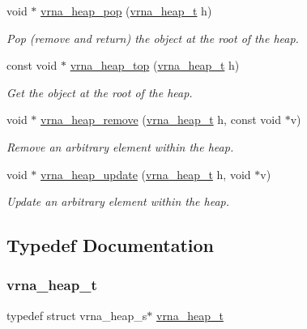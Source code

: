 \begin{DoxyCompactItemize}
void $\ast$ \mbox{\hyperlink{group__heap__utils_ga3b6242f3a1194eb1df2d1fb40d630610}{vrna\+\_\+heap\+\_\+pop}} (\mbox{\hyperlink{group__heap__utils_ga341ea87a651145b986792f6eb3e679c3}{vrna\+\_\+heap\+\_\+t}} h)
\begin{DoxyCompactList}\small\item\em Pop (remove and return) the object at the root of the heap. \end{DoxyCompactList}\item 
const void $\ast$ \mbox{\hyperlink{group__heap__utils_ga534a8483824371019241e340c026111b}{vrna\+\_\+heap\+\_\+top}} (\mbox{\hyperlink{group__heap__utils_ga341ea87a651145b986792f6eb3e679c3}{vrna\+\_\+heap\+\_\+t}} h)
\begin{DoxyCompactList}\small\item\em Get the object at the root of the heap. \end{DoxyCompactList}\item 
void $\ast$ \mbox{\hyperlink{group__heap__utils_ga5e181d5ef8557d502943b938620c7174}{vrna\+\_\+heap\+\_\+remove}} (\mbox{\hyperlink{group__heap__utils_ga341ea87a651145b986792f6eb3e679c3}{vrna\+\_\+heap\+\_\+t}} h, const void $\ast$v)
\begin{DoxyCompactList}\small\item\em Remove an arbitrary element within the heap. \end{DoxyCompactList}\item 
void $\ast$ \mbox{\hyperlink{group__heap__utils_gabdd04b8719b3d85c5ad53ed7dec9700b}{vrna\+\_\+heap\+\_\+update}} (\mbox{\hyperlink{group__heap__utils_ga341ea87a651145b986792f6eb3e679c3}{vrna\+\_\+heap\+\_\+t}} h, void $\ast$v)
\begin{DoxyCompactList}\small\item\em Update an arbitrary element within the heap. \end{DoxyCompactList}\end{DoxyCompactItemize}


\subsection{Typedef Documentation}
\mbox{\label{group__heap__utils_ga341ea87a651145b986792f6eb3e679c3}} 
\subsubsection{\texorpdfstring{vrna\_heap\_t}{vrna\_heap\_t}}
{\footnotesize\ttfamily typedef struct vrna\+\_\+heap\+\_\+s$\ast$ \mbox{\hyperlink{group__heap__utils_ga341ea87a651145b986792f6eb3e679c3}{vrna\+\_\+heap\+\_\+t}}}



